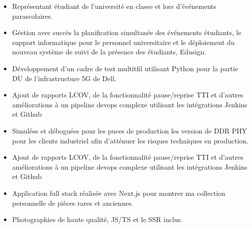 \documentclass[10pt,a4paper,ragged2e,withhyper]{altacv}
\begin{document}
\begin{paracol}{2}

\begin{itemize}
\item Représentant étudiant de l'université en classe et lors d'événements parascolaires.
\item Géstion avec succès la planification simultanée des événements étudiants, le support informatique pour le personnel universitaire et le déploiement du nouveau système de suivi de la présence des étudiants, Edusign.
\end{itemize}

\divider

\begin{itemize}
\item Développement d'un cadre de test multitfil utilisant Python pour la partie DU de l'infrastructure 5G de Dell.
\item Ajout de rapports LCOV, de la fonctionnalité pause/reprise TTI et d'autres améliorations à un pipeline devops complexe utilisant les intégrations Jenkins et Github
\end{itemize}

\divider

\begin{itemize}
\item Simulées et déboguées pour les puces de production les version de DDR PHY pour les clients industriel afin d'atténuer les risques techniques en production.
\item Ajout de rapports LCOV, de la fonctionnalité pause/reprise TTI et d'autres améliorations à un pipeline devops complexe utilisant les intégrations Jenkins et Github
\end{itemize}


\begin{itemize}
\item Application full stack réalisée avec Next.js pour montrer ma collection personnelle de pièces rares et anciennes.
\item Photographies de haute qualité, JS/TS et le SSR inclus.
\end{itemize}


\end{paracol}
\end{document}
